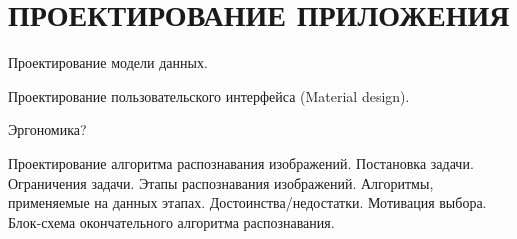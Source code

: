 \section[Проектирование приложения]{%
  ПРОЕКТИРОВАНИЕ ПРИЛОЖЕНИЯ
}

Проектирование модели данных.

Проектирование пользовательского интерфейса (Material design).

Эргономика?

Проектирование алгоритма распознавания изображений.
Постановка задачи. Ограничения задачи.
Этапы распознавания изображений. Алгоритмы, применяемые на данных этапах.
Достоинства/недостатки. Мотивация выбора.
Блок-схема окончательного алгоритма распознавания.
